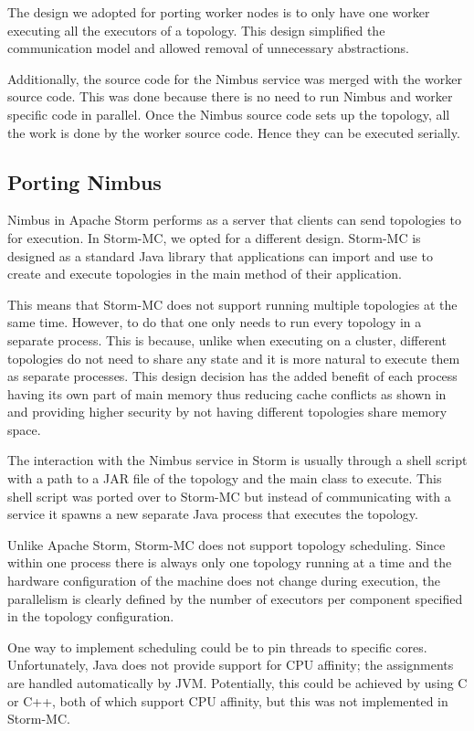 \documentclass[bsc,twoside,singlespacing,normalheadings,parskip]{infthesis}\usepackage[]{graphicx}\usepackage[]{color}
\begin{document}
The design we adopted for porting worker nodes is to only have one worker executing all the executors of a topology. This design simplified the communication model and allowed removal of unnecessary abstractions.

Additionally, the source code for the Nimbus service was merged with the worker source code. This was done because there is no need to run Nimbus and worker specific code in parallel. Once the Nimbus source code sets up the topology, all the work is done by the worker source code. Hence they can be executed serially.

\subsection{Porting Nimbus}

Nimbus in Apache Storm performs as a server that clients can send topologies to for execution. In Storm-MC, we opted for a different design. Storm-MC is designed as a standard Java library that applications can import and use to create and execute topologies in the main method of their application.

This means that Storm-MC does not support running multiple topologies at the same time. However, to do that one only needs to run every topology in a separate process. This is because, unlike when executing on a cluster, different topologies do not need to share any state and it is more natural to execute them as separate processes. This design decision has the added benefit of each process having its own part of main memory thus reducing cache conflicts as shown in \cite{Chandra:2005:PIC:1042442.1043432} and providing higher security by not having different topologies share memory space.

The interaction with the Nimbus service in Storm is usually through a shell script with a path to a JAR file of the topology and the main class to execute. This shell script was ported over to Storm-MC but instead of communicating with a service it spawns a new separate Java process that executes the topology.

Unlike Apache Storm, Storm-MC does not support topology scheduling. Since within one process there is always only one topology running at a time and the hardware configuration of the machine does not change during execution, the parallelism is clearly defined by the number of executors per component specified in the topology configuration.

One way to implement scheduling could be to pin threads to specific cores. Unfortunately, Java does not provide support for CPU affinity; the assignments are handled automatically by JVM. Potentially, this could be achieved by using C or C++, both of which support CPU affinity, but this was not implemented in Storm-MC.
\end{document}
